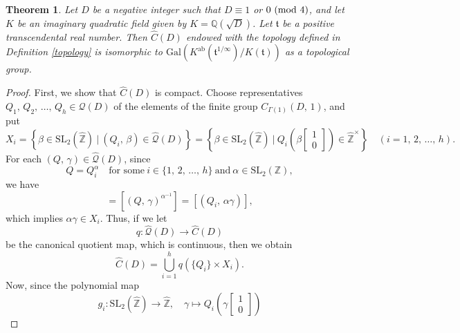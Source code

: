 \documentclass[reqno,11pt]{article}
\newcommand{\Mod}[1]{\ (\textup{mod}\ #1)}
\theoremstyle{plain} %
\newtheorem{theorem}{\indent\sc Theorem}[section]
\theoremstyle{definition} %
\begin{document}
\begin{theorem}\label{topological}
Let $D$ be a negative integer such that $D\equiv1$ or $0\Mod{4}$, 
and let $K$ be an imaginary quadratic field given by $K=\mathbb{Q}(\sqrt{D})$. 
Let $\mathfrak{t}$ be a positive transcendental real number.
Then $\widehat{C}(D)$ endowed with
the topology defined in Definition \ref{topology} 
is isomorphic to 
$\mathrm{Gal}\left(K^\mathrm{ab}(\mathfrak{t}^{1/\infty})
/K(\mathfrak{t})\right)$ as a topological group. 
\end{theorem}
\begin{proof}
First, we show that $\widehat{C}(D)$ is compact.
Choose representatives $Q_1,\,Q_2,\,\ldots,\,Q_h\in\mathcal{Q}(D)$ of the
elements of the finite group $C_{\Gamma(1)}(D,\,1)$, and put
\begin{equation*}
X_i=\left\{\beta\in\mathrm{SL}_2(\widehat{\mathbb{Z}})~|~
(Q_i,\,\beta)\in\widehat{\mathcal{Q}}(D)\right\}
=\left\{\beta\in\mathrm{SL}_2(\widehat{\mathbb{Z}})~|~
Q_i\left(\beta\begin{bmatrix}1\\0\end{bmatrix}\right)\in\widehat{\mathbb{Z}}^\times
\right\}\quad(i=1,\,2,\,\ldots,\,h). 
\end{equation*}
For each $(Q,\,\gamma)\in\widehat{\mathcal{Q}}(D)$, since
\begin{equation*}
Q=Q_i^\alpha\quad\textrm{for some}~i\in\{1,\,2,\,\ldots,\,h\}~
\textrm{and}~\alpha\in\mathrm{SL}_2(\mathbb{Z}), 
\end{equation*}
we have
\begin{equation*}
[(Q,\,\gamma)]=[(Q,\,\gamma)^{\alpha^{-1}}]=[(Q_i,\,\alpha\gamma)],
\end{equation*}
which implies $\alpha\gamma\in X_i$. 
Thus, if we let 
\begin{equation*}
q:\widehat{\mathcal{Q}}(D)\rightarrow\widehat{C}(D)
\end{equation*}
be the canonical quotient map, which is continuous, then we obtain
\begin{equation}\label{union}
\widehat{C}(D)=\bigcup_{i=1}^h
q(\{Q_i\}\times X_i).
\end{equation}
Now, since the polynomial map 
\begin{equation*}
g_i:\mathrm{SL}_2(\widehat{\mathbb{Z}})
\rightarrow\widehat{\mathbb{Z}},\quad
\gamma\mapsto Q_i\left(\gamma\begin{bmatrix}1\\0\end{bmatrix}\right)

\end{equation*}
\end{proof}
\end{document}
